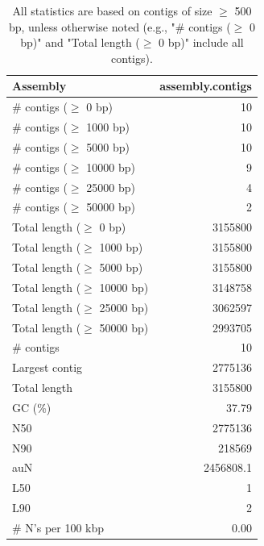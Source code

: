 \documentclass[12pt,a4paper]{article}
\begin{document}
\begin{table}[ht]
\begin{center}
\caption{All statistics are based on contigs of size $\geq$ 500 bp, unless otherwise noted (e.g., "\# contigs ($\geq$ 0 bp)" and "Total length ($\geq$ 0 bp)" include all contigs).}
\begin{tabular}{|l*{1}{|r}|}
\hline
Assembly & assembly.contigs \\ \hline
\# contigs ($\geq$ 0 bp) & 10 \\ \hline
\# contigs ($\geq$ 1000 bp) & 10 \\ \hline
\# contigs ($\geq$ 5000 bp) & 10 \\ \hline
\# contigs ($\geq$ 10000 bp) & 9 \\ \hline
\# contigs ($\geq$ 25000 bp) & 4 \\ \hline
\# contigs ($\geq$ 50000 bp) & 2 \\ \hline
Total length ($\geq$ 0 bp) & 3155800 \\ \hline
Total length ($\geq$ 1000 bp) & 3155800 \\ \hline
Total length ($\geq$ 5000 bp) & 3155800 \\ \hline
Total length ($\geq$ 10000 bp) & 3148758 \\ \hline
Total length ($\geq$ 25000 bp) & 3062597 \\ \hline
Total length ($\geq$ 50000 bp) & 2993705 \\ \hline
\# contigs & 10 \\ \hline
Largest contig & 2775136 \\ \hline
Total length & 3155800 \\ \hline
GC (\%) & 37.79 \\ \hline
N50 & 2775136 \\ \hline
N90 & 218569 \\ \hline
auN & 2456808.1 \\ \hline
L50 & 1 \\ \hline
L90 & 2 \\ \hline
\# N's per 100 kbp & 0.00 \\ \hline
\end{tabular}
\end{center}
\end{table}
\end{document}
